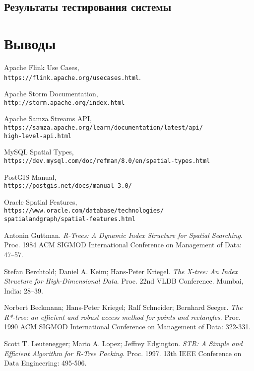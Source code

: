 \documentclass[14pt]{article}
\begin{document}
\subsection{Результаты тестирования системы}

\section{Выводы}

\begin{thebibliography}{9}
Apache Flink Use Cases,\\
\texttt{https://flink.apache.org/usecases.html}.

Apache Storm Documentation,\\
\texttt{http://storm.apache.org/index.html}

Apache Samza Streams API,\\
\texttt{https://samza.apache.org/learn/documentation/latest/api/\\high-level-api.html}

MySQL Spatial Types,\\
\texttt{https://dev.mysql.com/doc/refman/8.0/en/spatial-types.html}

PostGIS Manual,\\
\texttt{https://postgis.net/docs/manual-3.0/}

Oracle Spatial Features,\\
\texttt{https://www.oracle.com/database/technologies/\\spatialandgraph/spatial-features.html}

Antonin Guttman. \textit{R-Trees: A Dynamic Index Structure for Spatial Searching}. Proc. 1984 ACM SIGMOD International Conference on Management of Data: 47–57.

Stefan Berchtold; Daniel A. Keim; Hans-Peter Kriegel. \textit{The X-tree: An Index Structure for High-Dimensional Data}. Proc. 22nd VLDB Conference. Mumbai, India: 28–39.

Norbert Beckmann; Hans-Peter Kriegel; Ralf Schneider; Bernhard Seeger. \textit{The R*-tree: an efficient and robust access method for points and rectangles}. Proc. 1990 ACM SIGMOD International Conference on Management of Data: 322-331.

Scott T. Leutenegger; Mario A. Lopez; Jeffrey Edgington. \textit{STR: A Simple and Efficient Algorithm for R-Tree Packing}. Proc. 1997. 13th IEEE Conference on Data Engineering: 495-506.


\end{thebibliography}
\end{document}
